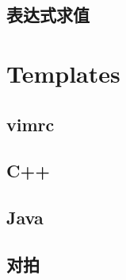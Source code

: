 \documentclass[10pt, a4paper]{article}
\begin{document}
	\subsection{表达式求值}
		

\section{Templates}
	\subsection{vimrc}
		
	\subsection{C++}
		
	\subsection{Java}
		
	\subsection{对拍}
		
\end{document}
